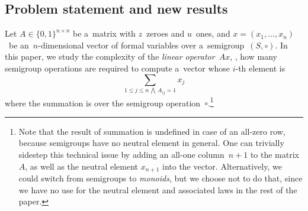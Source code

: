 \documentclass{toc}
\begin{document}
\subsection{Problem statement and new results}

Let $A \in \{0,1\}^{n \times n}$ be a~matrix with $z$~zeroes and $u$~ones, and
$x=(x_1, \dotsc, x_n)$~be an~$n$-dimensional vector of formal variables over
a~semigroup~$(S, \circ)$. In this paper, we study the complexity of the
\emph{linear operator}~$Ax$, \ie, how many semigroup operations are required to
compute a~vector whose $i$-th element is
\begin{equation}\label{eq-problem-statement}
\sum_{1 \le j \le n\,\bigwedge\,A_{ij}=1}x_j
\end{equation}
where the summation is over the semigroup operation~$\circ$.\footnote{Note that
the result of summation is undefined in case of an all-zero row, because
semigroups have no neutral element in general. One can trivially sidestep this
technical issue by adding an all-one column~$n+1$ to the matrix~$A$, as well as
the neutral element $x_{n+1}$ into the vector. Alternatively, we could switch
from semigroups to \emph{monoids}, but we choose not to do that, since we have
no use for the neutral element and associated laws in the rest of the paper.}
\end{document}
